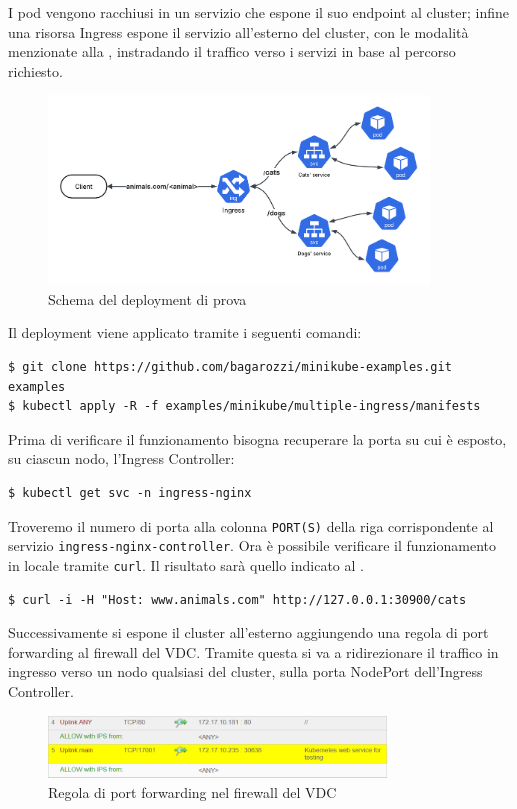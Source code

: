 \documentclass[12pt,a4paper,openright,twoside]{book}
\begin{document}
I pod vengono racchiusi in un servizio che espone il suo endpoint al cluster; infine una risorsa Ingress espone il servizio all'esterno del cluster,
con le modalità menzionate alla , instradando il traffico verso i servizi in base al percorso richiesto.
\begin{figure}[!hbt]
    \centering
    \includegraphics[width=0.9\textwidth]{figures/test-deployment.png}
    \caption{Schema del deployment di prova}
    \label{fig:test-deployment}
\end{figure}
\FloatBarrier
Il deployment viene applicato tramite i seguenti comandi:
\begin{lstlisting}
$ git clone https://github.com/bagarozzi/minikube-examples.git examples
$ kubectl apply -R -f examples/minikube/multiple-ingress/manifests
\end{lstlisting}
Prima di verificare il funzionamento bisogna recuperare la porta su cui è esposto, su ciascun nodo, l'Ingress Controller:
\begin{lstlisting}
$ kubectl get svc -n ingress-nginx                
\end{lstlisting}
Troveremo il numero di porta alla colonna \texttt{PORT(S)} della riga corrispondente al servizio \texttt{ingress-nginx-controller}.
Ora è possibile verificare il funzionamento in locale tramite \texttt{curl}. Il risultato sarà quello indicato al .
\begin{lstlisting}
$ curl -i -H "Host: www.animals.com" http://127.0.0.1:30900/cats
\end{lstlisting}
Successivamente si espone il cluster all'esterno aggiungendo una regola di port forwarding al firewall del VDC. Tramite questa si va a ridirezionare il traffico in ingresso verso
un nodo qualsiasi del cluster, sulla porta NodePort dell'Ingress Controller.
\begin{figure}[!hbt]
    \centering
    \includegraphics[width=0.8\textwidth]{figures/forwarding-rule.png}
    \caption{Regola di port forwarding nel firewall del VDC}
    \label{fig:firewall-rule}
\end{figure}
\end{document}
